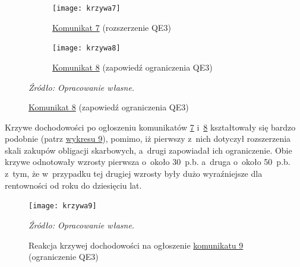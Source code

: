\vspace{0.5cm}
\hypertarget{fig9}{}
\begin{figure}[H]
\centering
\captionsetup{format=hang}
\caption{Reakcje krzywych dochodowości na ogłoszenie komunikatów \protect\hyperlink{kom7}{7} oraz \protect\hyperlink{kom8}{8}}
\begin{subfigure}{.5\textwidth}
\hspace{-3cm}\texttt{[image: krzywa7]}
 \caption{\protect\hyperlink{kom7}{Komunikat 7} (rozszerzenie QE3)}
\hypertarget{fig10}{}
\vspace*{\floatsep} %
\end{subfigure}
\begin{subfigure}{.5\textwidth}
\hspace{-3cm}\texttt{[image: krzywa8]}
\caption{\protect\hyperlink{kom8}{Komunikat 8} (zapowiedź ograniczenia QE3)}
\end{subfigure}
\begin{flushleft}
\hspace{1cm}\textit{\footnotesize{Źródło: Opracowanie własne.}} \\
\end{flushleft}
\vspace{-0.5cm}
\end{figure}

Krzywe dochodowości po ogłoszeniu komunikatów \hyperlink{kom7}{7} i~\hyperlink{kom8}{8} kształtowały się bardzo podobnie (patrz \hyperlink{fig9}{wykresu 9}), pomimo, iż pierwszy z~nich dotyczył rozszerzenia skali zakupów obligacji skarbowych, a~drugi zapowiadał ich ograniczenie. Obie krzywe odnotowały wzrosty pierwsza o~około 30~p.b. a~druga o~około 50~p.b. z~tym, że w~przypadku tej drugiej wzrosty były dużo wyraźniejsze dla rentowności od roku do dziesięciu lat. 

\vspace{0.25cm}
\hypertarget{fig11}{}
\begin{figure}[h]
\begin{centering}
  \texttt{[image: krzywa9]}
    \captionsetup{format=hang}
    \caption{Reakcja krzywej dochodowości na ogłoszenie \protect\hyperlink{kom9}{komunikatu 9} (ograniczenie QE3)}
\end{centering}
\begin{flushleft}
\hspace{1cm}\textit{\footnotesize{Źródło: Opracowanie własne.}} \\
\end{flushleft}
\vspace{-0.5cm}
\end{figure}

